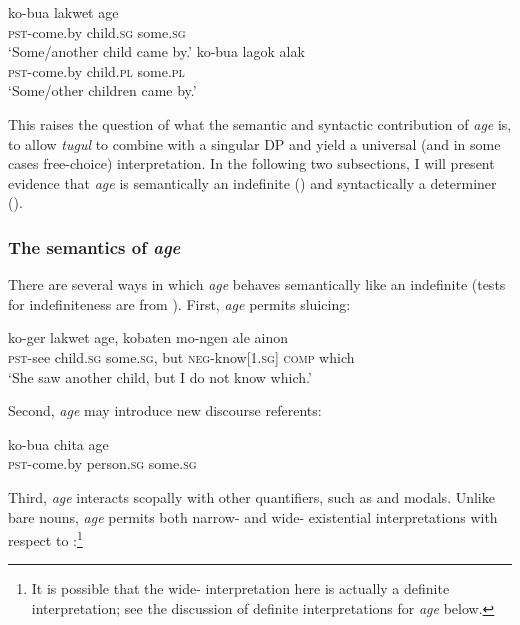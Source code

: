 \documentclass[output=paper]{LSP/langsci}
\begin{document}
\ea \label{ex:agealak}  
\ea
\gll ko-bua lakwet age\\
	   \textsc{pst}-come.by child.\textsc{sg} some.\textsc{sg}\\
  \glt ‘Some/another child came by.’
\ex 
\gll ko-bua lagok alak\\
	   \textsc{pst}-come.by child.\textsc{pl} some.\textsc{pl}\\
  \glt ‘Some/other children came by.’
  \z
\z

This raises the question of what the semantic and syntactic contribution of \textit{age} is, to allow \textit{tugul} to combine with a singular DP and yield a universal (and in some cases free-choice) interpretation. In the following two subsections, I will present evidence that \textit{age} is semantically an indefinite () and syntactically a determiner ().

\subsubsection{The semantics of \textit{age}}
\label{sec:landman:agesem}
There are several ways in which \textit{age} behaves semantically like an indefinite (tests for indefiniteness are from \citealt{Matthewson:1999}). First, \textit{age} permits sluicing:

\ea \label{ex:landman:sluicingage}
    \gll ko-ger lakwet age, kobaten mo-ngen ale ainon\\
         \textsc{pst}-see child.\textsc{sg} some.\textsc{sg}, but \textsc{neg}-know[1.\textsc{sg}] \textsc{comp} which\\
    \glt ‘She saw another child, but I do not know which.’
\z

 Second, \textit{age} may introduce new discourse referents:

\ea
  \gll ko-bua chita age\\
       \textsc{pst}-come.by person.\textsc{sg} some.\textsc{sg}\\
\z

 Third, \textit{age} interacts scopally with other quantifiers, such as  and modals. Unlike bare nouns, \textit{age} permits both narrow- and wide- existential interpretations with respect to :\footnote{It is possible that the wide- interpretation here is actually a definite interpretation; see the discussion of definite interpretations for \textit{age} below.}
\end{document}
